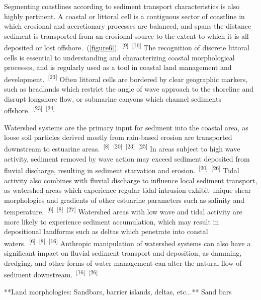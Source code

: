 \documentclass{article}
\begin{document}
\newpage
{}
\fancyfoot[C]{\thepage} 
\thispagestyle{fancy}

{Segmenting coastlines according to sediment transport characteristics is also highly pertinent. A coastal or littoral cell is a contiguous sector of coastline in which erosional and accretionary processes are balanced, and spans the distance sediment is transported from an erosional source to the extent to which it is all deposited or lost offshore.~(\cref{figure6}).~\textsuperscript{[9]}~\textsuperscript{[16]} The recognition of discrete littoral cells is essential to understanding and characterizing coastal morphological processes, and is regularly used as a tool in coastal land management and development.~\textsuperscript{[23]} Often littoral cells are bordered by clear geographic markers, such as headlands which restrict the angle of wave approach to the shoreline and disrupt longshore flow, or submarine canyons which channel sediments offshore.~\textsuperscript{[23]}~\textsuperscript{[24]} \par}

\par{Watershed systems are the primary input for sediment into the coastal area, as loose soil particles derived mostly from rain-based erosion are transported downstream to estuarine areas.~\textsuperscript{[8]}~\textsuperscript{[20]}~\textsuperscript{[23]}~\textsuperscript{[25]} In areas subject to high wave activity, sediment removed by wave action may exceed sediment deposited from fluvial discharge, resulting in sediment starvation and erosion.~\textsuperscript{[20]}~\textsuperscript{[26]} Tidal activity also combines with fluvial discharge to influence local sediment transport, as watershed areas which experience regular tidal intrusion exhibit unique shear morphologies and gradients of other estuarine parameters such as salinity and temperature.~\textsuperscript{[6]}~\textsuperscript{[8]}~\textsuperscript{[27]} Watershed areas with low wave and tidal activity are more likely to experience sediment accumulation, which may result in depositional landforms such as deltas which penetrate into coastal waters.~\textsuperscript{[6]}~\textsuperscript{[8]}~\textsuperscript{[16]} Anthropic manipulation of watershed systems can also have a significant impact on fluvial sediment transport and deposition, as damming, dredging, and other forms of water management can alter the natural flow of sediment downstream.~\textsuperscript{[16]}~\textsuperscript{[26]}}

\par{**Land morphologies: Sandbars, barrier islands, deltas, etc...**
Sand bars }
\end{document}
